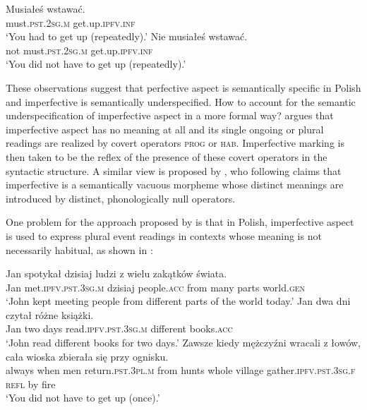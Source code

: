 \documentclass[output=paper]{langscibook}
\begin{document}
\ea\label{jan-bla:fansb:kb:ex9}
\ea \gll Musiałeś wstawać.\\  
        must.\textsc{pst}.\textsc{2sg}.\textsc{m}  get.up.\textsc{ipfv}.\textsc{inf}\\
\glt ‘You had to get up (repeatedly).’\label{jan-bla:fansb:kb:ex9a}
\ex \gll Nie musiałeś wstawać.\\  
        not must.\textsc{pst}.\textsc{2sg}.\textsc{m} get.up.\textsc{ipfv}.\textsc{inf}\\
\glt ‘You did not have to get up (repeatedly).’\label{jan-bla:fansb:kb:ex9b}
\z
\z

\noindent These observations suggest that perfective aspect is semantically specific in Polish and imperfective is semantically underspecified. How to account for the semantic underspecification of imperfective aspect in a more formal way? \citet{Hacquard2006} argues that imperfective aspect has no meaning at all and its single ongoing or plural readings are realized by covert operators \textsc{prog} or \textsc{hab}. Imperfective marking is then taken to be the reflex of the presence of these covert operators in the syntactic structure. A similar view is proposed by \citet{Frąckowiak2015}, who following \citet{Hacquard2006} claims that imperfective is a semantically vacuous morpheme whose distinct meanings are introduced by distinct, phonologically null operators.

One problem for the approach proposed by \citet{Hacquard2006} is that in Polish, imperfective aspect is used to express plural event readings in contexts whose meaning is not necessarily habitual, as shown in :

\ea\label{jan-bla:fansb:kb:ex10}
\ea \gll Jan spotykał dzisiaj ludzi z wielu zakątków świata.\\  
       Jan met.\textsc{ipfv}.\textsc{pst}.\textsc{3sg}.\textsc{m} dzisiaj people.\textsc{acc} from many parts world.\textsc{gen}\\ 
\glt ‘John kept meeting people from different parts of the world today.’\label{jan-bla:fansb:kb:ex10a}
\ex \gll Jan dwa dni czytał różne książki. \\  
        Jan two days read.\textsc{ipfv}.\textsc{pst}.\textsc{3sg}.\textsc{m} different books.\textsc{acc}\\
\glt ‘John read different books for two days.’\label{jan-bla:fansb:kb:ex10b}
\ex \gll Zawsze kiedy mężczyźni wracali z łowów, cała wioska zbierała się przy ognisku.\\  
        always when men return.\textsc{pst}.\textsc{3pl}.\textsc{m} from hunts whole village gather.\textsc{ipfv.pst.3sg.f} \textsc{refl} by fire\\
\glt ‘You did not have to get up (once).’\label{jan-bla:fansb:kb:ex10c}
\z
\z
\end{document}

